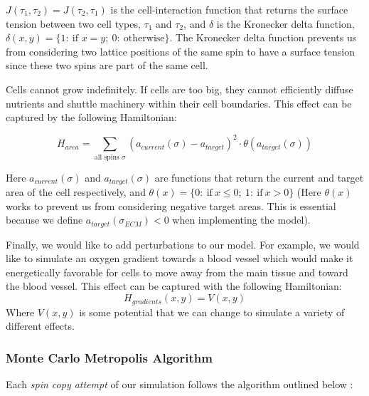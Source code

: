 \documentclass[12pt]{article}
\begin{document}
$J(\tau_1, \tau_2)=J(\tau_2, \tau_1)$ is the cell-interaction function that returns the surface tension between two cell types, $\tau_1$ and $\tau_2$, and $\delta$ is the Kronecker delta function, $\delta(x,y)=\{1:~\text{if }x=y;~0:~\text{otherwise}\}$. The Kronecker delta function prevents us from considering two lattice positions of the same spin to have a surface tension since these two spins are part of the same cell.

Cells cannot grow indefinitely. If cells are too big, they cannot efficiently diffuse nutrients and shuttle machinery within their cell boundaries. This effect can be captured by the following Hamiltonian:

\begin{equation}
	H_{area} = \sum_{\text{all spins }\sigma} (a_{current}(\sigma)-a_{target})^2 \cdot \theta(a_{target}(\sigma))
	\label{H_area}
\end{equation}

Here $a_{current}(\sigma)$ and $a_{target}(\sigma)$ are functions that return the current and target area of the cell respectively, and $\theta(x)=\{0:~\text{if}~x\leq 0;~1:~\text{if}~x>0\}$ (Here $\theta(x)$ works to prevent us from considering negative target areas. This is essential because we define $a_{target}(\sigma_{ECM}) < 0$ when implementing the model).

Finally, we would like to add perturbations to our model. For example, we would like to simulate an oxygen gradient towards a blood vessel which would make it energetically favorable for cells to move away from the main tissue and toward the blood vessel. This effect can be captured with the following Hamiltonian:
\begin{equation}
	H_{gradients}(x,y) = V(x,y)
\end{equation}
Where $V(x,y)$ is some potential that we can change to simulate a variety of different effects.

\subsubsection{Monte Carlo Metropolis Algorithm}
Each \emph{spin copy attempt} of our simulation follows the algorithm outlined below \cite{Glazier2007}:
\end{document}
